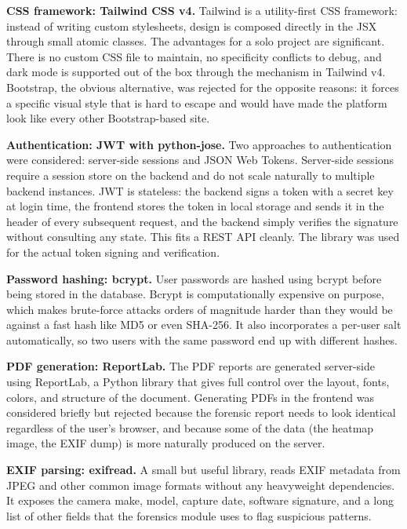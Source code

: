 \noindent\textbf{CSS framework: Tailwind CSS v4.} Tailwind is a utility-first CSS framework: instead of writing custom stylesheets, design is composed directly in the JSX through small atomic classes. The advantages for a solo project are significant. There is no custom CSS file to maintain, no specificity conflicts to debug, and dark mode is supported out of the box through the  mechanism in Tailwind v4. Bootstrap, the obvious alternative, was rejected for the opposite reasons: it forces a specific visual style that is hard to escape and would have made the platform look like every other Bootstrap-based site.

\noindent\textbf{Authentication: JWT with python-jose.} Two approaches to authentication were considered: server-side sessions and JSON Web Tokens. Server-side sessions require a session store on the backend and do not scale naturally to multiple backend instances. JWT is stateless: the backend signs a token with a secret key at login time, the frontend stores the token in local storage and sends it in the  header of every subsequent request, and the backend simply verifies the signature without consulting any state. This fits a REST API cleanly. The  library was used for the actual token signing and verification.

\noindent\textbf{Password hashing: bcrypt.} User passwords are hashed using bcrypt before being stored in the database. Bcrypt is computationally expensive on purpose, which makes brute-force attacks orders of magnitude harder than they would be against a fast hash like MD5 or even SHA-256. It also incorporates a per-user salt automatically, so two users with the same password end up with different hashes.

\noindent\textbf{PDF generation: ReportLab.} The PDF reports are generated server-side using ReportLab, a Python library that gives full control over the layout, fonts, colors, and structure of the document. Generating PDFs in the frontend was considered briefly but rejected because the forensic report needs to look identical regardless of the user's browser, and because some of the data (the heatmap image, the EXIF dump) is more naturally produced on the server.

\noindent\textbf{EXIF parsing: exifread.} A small but useful library,  reads EXIF metadata from JPEG and other common image formats without any heavyweight dependencies. It exposes the camera make, model, capture date, software signature, and a long list of other fields that the forensics module uses to flag suspicious patterns.

